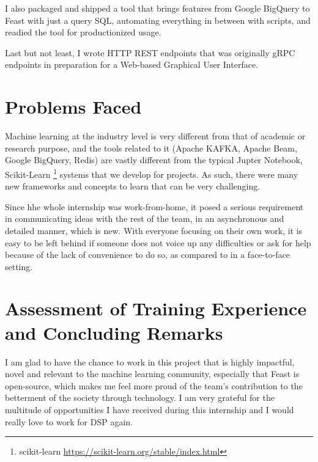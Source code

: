 \documentclass[a4paper, 12pt, fleqn]{report}
\begin{document}
I also packaged and shipped a tool that brings features from Google BigQuery to
Feast with just a query SQL, automating everything in between with scripts, and
readied the tool for productionized usage.
\newline

Last but not least, I wrote HTTP REST endpoints that was originally gRPC
endpoints in preparation for a Web-based Graphical User Interface.

\section{Problems Faced}
Machine learning at the industry level is very different from that of academic
or research purpose, and the tools related to it (Apache KAFKA, Apache Beam,
Google BigQuery, Redis) are vastly different from the typical Jupter Notebook,
Scikit-Learn \footnote{scikit-learn
  \url{https://scikit-learn.org/stable/index.html}} systems that we develop for
projects. As such, there were many new frameworks and concepts to learn that can
be very challenging. \newline

Since hhe whole internship was work-from-home, it posed a serious requirement in
communicating ideas with the rest of the team, in an asynchronous and detailed
manner, which is new. With everyone focusing on their own work, it is easy to
be left behind if someone does not voice up any difficulties or ask for help
because of the lack of convenience to do so, as compared to in a face-to-face
setting.

\section{Assessment of Training Experience and Concluding Remarks}
I am glad to have the chance to work in this project that is highly impactful,
novel and relevant to the machine learning community, especially that Feast is
open-source, which makes me feel more proud of the team's contribution to the
betterment of the society through technology. I am very grateful for the
multitude of opportunities I have received during this internship and I would
really love to work for DSP again.

\printbibliography
\end{document}
